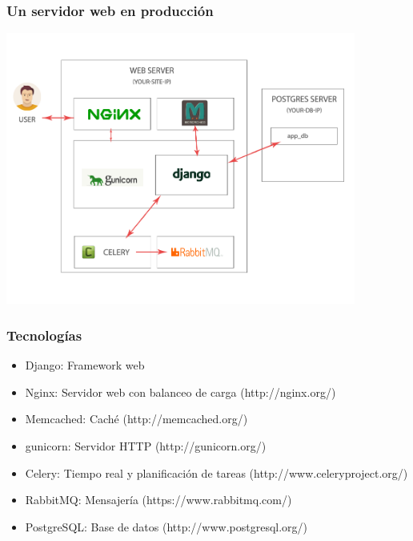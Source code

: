 \begin{frame}
\frametitle{Un servidor web en producción}

\includegraphics[width=11.5cm]{figs/django-y-mas} 

\end{frame}

\begin{frame}
\frametitle{Tecnologías}

\begin{itemize}
  \item Django: Framework web
  \item Nginx: Servidor web con balanceo de carga (http://nginx.org/)
  \item Memcached: Caché (http://memcached.org/)
  \item gunicorn: Servidor HTTP (http://gunicorn.org/)
  \item Celery: Tiempo real y planificación de tareas (http://www.celeryproject.org/)
  \item RabbitMQ: Mensajería (https://www.rabbitmq.com/)
  \item PostgreSQL: Base de datos (http://www.postgresql.org/)
\end{itemize}

\end{frame}






